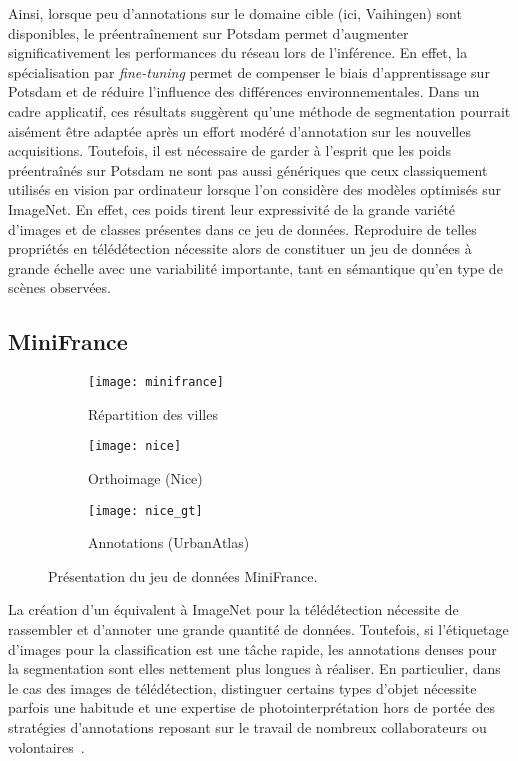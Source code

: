 Ainsi, lorsque peu d'annotations sur le domaine cible (ici, Vaihingen) sont disponibles, le préentraînement sur Potsdam permet d'augmenter significativement les performances du réseau lors de l'inférence. En effet, la spécialisation par \emph{fine-tuning} permet de compenser le biais d'apprentissage sur Potsdam et de réduire l'influence des différences environnementales. Dans un cadre applicatif, ces résultats suggèrent qu'une méthode de segmentation pourrait aisément être adaptée après un effort modéré d'annotation sur les nouvelles acquisitions. Toutefois, il est nécessaire de garder à l'esprit que les poids préentraînés sur Potsdam ne sont pas aussi génériques que ceux classiquement utilisés en vision par ordinateur lorsque l'on considère des modèles optimisés sur ImageNet. En effet, ces poids tirent leur expressivité de la grande variété d'images et de classes présentes dans ce jeu de données. Reproduire de telles propriétés en télédétection nécessite alors de constituer un jeu de données à grande échelle avec une variabilité importante, tant en sémantique qu'en type de scènes observées.


\subsection{MiniFrance}

\begin{figure}[h]
    \centering
    \begin{subfigure}[b]{0.3\textwidth}
        \texttt{[image: minifrance]}
        \caption*{Répartition des villes}
    \end{subfigure}
    \begin{subfigure}[b]{0.28\textwidth}
        \texttt{[image: nice]}
        \caption*{Orthoimage (Nice)}
    \end{subfigure}
    \begin{subfigure}[b]{0.28\textwidth}
        \texttt{[image: nice\_gt]}
        \caption*{Annotations (UrbanAtlas)}
    \end{subfigure}
       \caption{Présentation du jeu de données MiniFrance.}
			 \label{fig:minifrance}
\end{figure}

La création d'un équivalent à \gls{ImageNet} pour la télédétection nécessite de rassembler et d'annoter une grande quantité de données. Toutefois, si l'étiquetage d'images pour la classification est une tâche rapide, les annotations denses pour la segmentation sont elles nettement plus longues à réaliser. En particulier, dans le cas des images de télédétection, distinguer certains types d'objet nécessite parfois une habitude et une expertise de photointerprétation hors de portée des stratégies d'annotations reposant sur le travail de nombreux collaborateurs ou volontaires~\cite{barriuso_notes_2012}.

